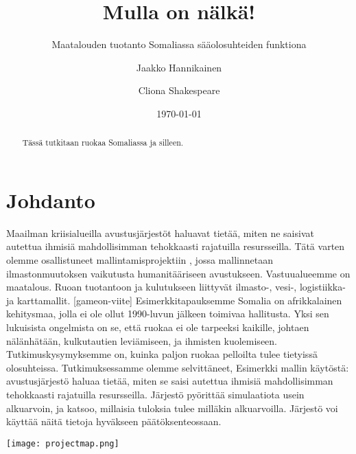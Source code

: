 \documentclass[12pt]{scrreprt}
\title{Mulla on nälkä!}
\subtitle{Maatalouden tuotanto Somaliassa sääolosuhteiden funktiona}
\author{Jaakko Hannikainen \and Cliona Shakespeare}
\date{\today}
\begin{document}
  \maketitle

  \begin{abstract}
    Tässä tutkitaan ruokaa Somaliassa ja silleen.
  \end{abstract}

  \tableofcontents

  \chapter{Johdanto}

  
  Maailman kriisialueilla avustusjärjestöt haluavat tietää, miten ne saisivat 
  autettua ihmisiä mahdollisimman tehokkaasti rajatuilla resursseilla. Tätä 
  varten olemme osallistuneet mallintamisprojektiin \cite{scythe}, jossa mallinnetaan
  ilmastonmuutoksen vaikutusta humanitääriseen avustukseen. Vastuualueemme on maatalous. 
  Ruoan tuotantoon ja kulutukseen liittyvät ilmasto-, vesi-, logistiikka- ja karttamallit.
  [gameon-viite]
  Esimerkkitapauksemme Somalia on afrikkalainen kehitysmaa, jolla ei ole ollut 1990-luvun 
  jälkeen toimivaa hallitusta. Yksi sen lukuisista ongelmista on se, että ruokaa ei ole 
  tarpeeksi kaikille, johtaen nälänhätään, kulkutautien leviämiseen, ja ihmisten 
  kuolemiseen. 
  Tutkimuskysymyksemme on, kuinka paljon ruokaa pelloilta tulee tietyissä olosuhteissa.
  Tutkimuksessamme olemme selvittäneet,
  Esimerkki mallin käytöstä: avustusjärjestö haluaa tietää, miten se saisi autettua 
  ihmisiä mahdollisimman tehokkaasti rajatuilla resursseilla. Järjestö pyörittää 
  simulaatiota usein alkuarvoin, ja katsoo, millaisia tuloksia tulee milläkin alkuarvoilla.
  Järjestö voi käyttää näitä tietoja hyväkseen päätöksenteossaan.

  \texttt{[image: projectmap.png]}
  
  
  
  
  
\end{document}
